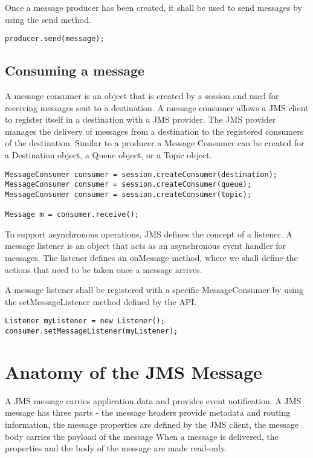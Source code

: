 \documentclass[9pt,twocolumn,twoside]{styles/osajnl}
\begin{document}
Once a message producer has been created, it shall be used to send
messages by using the send method.

\begin{lstlisting}
producer.send(message);
\end{lstlisting}

\subsection{Consuming a message}

A message consumer is an object that is created by a session and used
for receiving messages sent to a destination.  A message consumer
allows a JMS client to register itself in a destination with a JMS
provider. The JMS provider manages the delivery of messages from a
destination to the registered consumers of the destination.  Similar
to a producer a Message Consumer can be created for a Destination
object, a Queue object, or a Topic object.

\begin{lstlisting}
MessageConsumer consumer = session.createConsumer(destination);
MessageConsumer consumer = session.createConsumer(queue);
MessageConsumer consumer = session.createConsumer(topic);

Message m = consumer.receive();
\end{lstlisting}

To support asynchronous operations, JMS defines the concept of a
listener.  A message listener is an object that acts as an
asynchronous event handler for messages. The listener defines an
onMessage method, where we shall define the actions that need to be
taken once a message arrives.

A message listener shall be registered with a specific MessageConsumer
by using the setMessageListener method defined by the API.

\begin{lstlisting}
Listener myListener = new Listener();
consumer.setMessageListener(myListener);
\end{lstlisting}

\section{Anatomy of the JMS Message}


A JMS message carries application data and provides event
notification.  A JMS message has three parts - the message headers
provide metadata and routing information, the message properties are
defined by the JMS client, the message body carries the payload of the
message When a message is delivered, the properties and the body of
the message are made read-only. \cite{www-jms-fischli-article}
\end{document}
